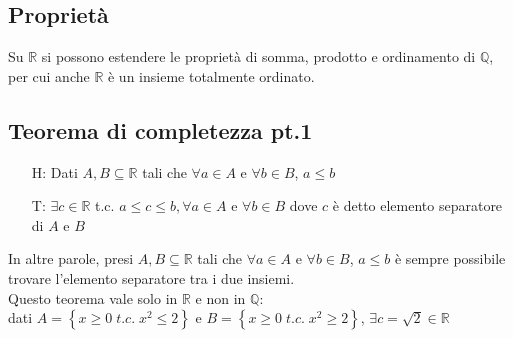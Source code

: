 \documentclass[a4paper]{article}
\begin{document}
\subsection{Proprietà}
Su \(\mathbb{R}\) si possono estendere le proprietà di somma, prodotto e ordinamento di \(\mathbb{Q}\), per cui anche \(\mathbb{R}\) è un insieme totalmente ordinato.


\subsection{Teorema di completezza pt.1}
\begin{itemize}
	\item[H:] Dati \(A, B \subseteq \mathbb{R}\) tali che \(\forall a \in A\) e \(\forall b \in B\), \(a \leq b\)
	\item[T:] \(\exists c \in \mathbb{R}\) t.c. \(a \leq c \leq b, \forall a \in A\) e \(\forall b \in B\) dove \(c\) è detto elemento separatore di \(A\) e \(B\)
\end{itemize}
In altre parole, presi \(A, B \subseteq \mathbb{R}\) tali che \(\forall a \in A\) e \(\forall b \in B\), \(a \leq b\) è sempre possibile trovare l'elemento separatore tra i due insiemi. \\
Questo teorema vale solo in \(\mathbb{R}\) e non in \(\mathbb{Q}\): \\
dati \(A=\left\{ x \geq 0 \; t.c. \; x^2 \leq 2 \right\}\) e \(B=\left\{ x \geq 0 \; t.c. \; x^2 \geq 2 \right\}\), \(\exists c = \sqrt{2} \in \mathbb{R}\)
\end{document}
